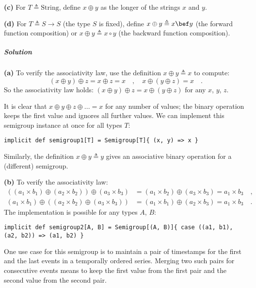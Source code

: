 \textbf{(c)} For $T\triangleq\text{String}$, define $x\oplus y$
as the longer of the strings $x$ and $y$.

\textbf{(d)} For $T\triangleq S\rightarrow S$ (the type $S$ is fixed),
define $x\oplus y\triangleq x\bef y$ (the forward function composition)
or $x\oplus y\triangleq x\circ y$ (the backward function composition).

\subparagraph{Solution}

\textbf{(a)} To verify the associativity law, use the definition $x\oplus y\triangleq x$
to compute:
\[
\left(x\oplus y\right)\oplus z=x\oplus z=x\quad,\quad x\oplus\left(y\oplus z\right)=x\quad.
\]
So the associativity law holds: $\left(x\oplus y\right)\oplus z=x\oplus\left(y\oplus z\right)$
for any $x$, $y$, $z$.

It is clear that $x\oplus y\oplus z\oplus...=x$ for any number of
values; the binary operation keeps the first value and ignores all
further values. We can implement this semigroup instance at once for
all types $T$:
\begin{lstlisting}
implicit def semigroup1[T] = Semigroup[T]{ (x, y) => x }
\end{lstlisting}
Similarly, the definition $x\oplus y\triangleq y$ gives an associative
binary operation for a (different) semigroup.

\textbf{(b)} To verify the associativity law:
\begin{align*}
\left(\left(a_{1}\times b_{1}\right)\oplus\left(a_{2}\times b_{2}\right)\right)\oplus\left(a_{3}\times b_{3}\right) & =\left(a_{1}\times b_{2}\right)\oplus\left(a_{3}\times b_{3}\right)=a_{1}\times b_{3}\quad,\\
\left(a_{1}\times b_{1}\right)\oplus\left(\left(a_{2}\times b_{2}\right)\oplus\left(a_{3}\times b_{3}\right)\right) & =\left(a_{1}\times b_{1}\right)\oplus\left(a_{2}\times b_{3}\right)=a_{1}\times b_{3}\quad.
\end{align*}
The implementation is possible for any types $A$, $B$:
\begin{lstlisting}
implicit def semigroup2[A, B] = Semigroup[(A, B)]{ case ((a1, b1), (a2, b2)) => (a1, b2) }
\end{lstlisting}

One use case for this semigroup is to maintain a pair of timestamps
for the first and the last events in a temporally ordered series.
Merging two such pairs for consecutive events means to keep the first
value from the first pair and the second value from the second pair.

